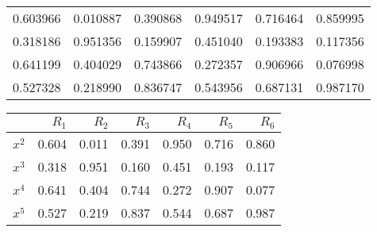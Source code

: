 \documentclass[12pt]{article}
\begin{document}
\newpage

\clearpage


\begin{tabular}{rrrrrr}
\toprule
0.603966 & 0.010887 & 0.390868 & 0.949517 & 0.716464 & 0.859995 \\
0.318186 & 0.951356 & 0.159907 & 0.451040 & 0.193383 & 0.117356 \\
0.641199 & 0.404029 & 0.743866 & 0.272357 & 0.906966 & 0.076998 \\
0.527328 & 0.218990 & 0.836747 & 0.543956 & 0.687131 & 0.987170 \\
\bottomrule
\end{tabular}


\begin{tabular}{lrrrrrr}
\toprule
{} &  $R_{1}$ &  $R_{2}$ &  $R_{3}$ &  $R_{4}$ &  $R_{5}$ &  $R_{6}$ \\
\midrule
$x^{2}$ &    0.604 &    0.011 &    0.391 &    0.950 &    0.716 &    0.860 \\
$x^{3}$ &    0.318 &    0.951 &    0.160 &    0.451 &    0.193 &    0.117 \\
$x^{4}$ &    0.641 &    0.404 &    0.744 &    0.272 &    0.907 &    0.077 \\
$x^{5}$ &    0.527 &    0.219 &    0.837 &    0.544 &    0.687 &    0.987 \\
\bottomrule
\end{tabular}
\end{document}
